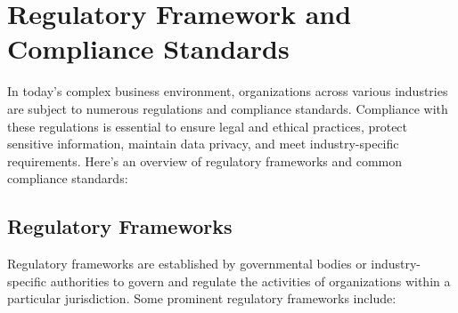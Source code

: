 \chapter{Regulatory Framework and Compliance Standards}

In today's complex business environment, organizations across various industries are subject to numerous regulations and compliance standards. Compliance with these regulations is essential to ensure legal and ethical practices, protect sensitive information, maintain data privacy, and meet industry-specific requirements. Here's an overview of regulatory frameworks and common compliance standards:


\section*{Regulatory Frameworks}

Regulatory frameworks are established by governmental bodies or industry-specific authorities to govern and regulate the activities of organizations within a particular jurisdiction. Some prominent regulatory frameworks include:

